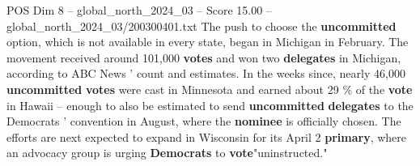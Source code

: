 \begin{textsample}{POS Dim 8 – global\_north\_2024\_03 – Score 15.00 – global\_north\_2024\_03/200300401.txt}
The push to choose the \textbf{uncommitted} option, which is not available in every state, began in Michigan in February.
The movement received around 101,000 \textbf{votes} and won two \textbf{delegates} in Michigan, according to ABC News ' count and estimates.
In the weeks since, nearly 46,000 \textbf{uncommitted} \textbf{votes} were cast in Minnesota and earned about 29 \% of the \textbf{vote} in Hawaii -- enough to also be estimated to send \textbf{uncommitted} \textbf{delegates} to the Democrats ' convention in August, where the \textbf{nominee} is officially chosen.
The efforts are next expected to expand in Wisconsin for its April 2 \textbf{primary}, where an advocacy group is urging \textbf{Democrats} to \textbf{vote}"uninstructed."

\end{textsample}
